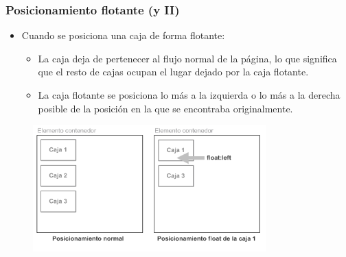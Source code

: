 \documentclass[ucs]{beamer}
\begin{document}
\begin{frame}
\frametitle{Posicionamiento flotante (y II)}

\begin{itemize}
  \item Cuando se posiciona una caja de forma flotante:
  \begin{itemize}
    \item La caja deja de pertenecer al flujo normal de la página, lo que significa que el resto de cajas ocupan el lugar dejado por la caja flotante.
    \item La caja flotante se posiciona lo más a la izquierda o lo más a la derecha posible de la posición en la que se encontraba originalmente.
  \end{itemize}
\end{itemize}


\begin{center}
\begin{figure}[p]
\includegraphics[width=0.8\textwidth]{figs/f0508.png}
\end{figure}
\end{center}

\end{frame}


\end{document}
